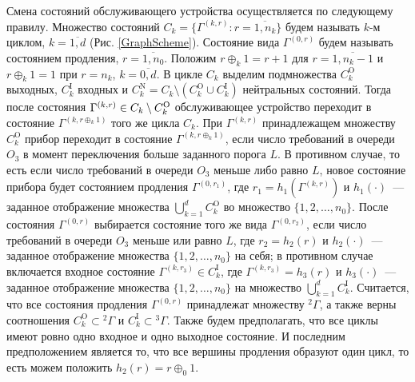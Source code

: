 \documentclass{report}
\begin{document}
Смена состояний обслуживающего устройства осуществляется по следующему правилу. Множество состояний $C_k = \{\Gamma^{(k,r)} \colon r=\overline{1,n_k}\}$ будем называть $k$-м циклом, $k=\overline{1,d}$ (Рис. \ref{GraphScheme}). Состояние вида $\Gamma^{(0,r)}$ будем называть состоянием продления, $r=\overline{1,n_0}$. Положим $r \oplus_k 1 = r+1$ для $r=\overline{1,n_k-1}$ и $r \oplus_k 1 = 1$ при $r=n_k$, $k = \overline{0,d}$. В цикле $C_k$ выделим подмножества $C_k^{\mathrm{O}}$ выходных, $C_k^{\mathrm{I}}$ входных и $C_k^{\mathrm{N}} = C_k \setminus (C_k^{\mathrm{O}} \cup C_k^{\mathrm{I}})$ нейтральных состояний. Тогда после состояния $\Gamma^{(k,r)} \hm\in C_k\setminus C_k^{\mathrm{O}}$ обслуживающее устройство переходит в состояние $\Gamma^{(k,r \oplus_k 1)}$ того же цикла $C_k$. При $\Gamma^{(k,r)}$ принадлежащем множеству $C_k^{\mathrm{O}}$ прибор переходит в состояние $\Gamma^{(k,r \oplus_k 1)}$, если число требований в очереди $O_3$ в момент переключения больше заданного порога $L$. В противном случае, то есть если число требований в очереди $O_3$ меньше либо равно $L$, новое состояние прибора будет состоянием продления $\Gamma^{(0,r_1)}$, где $r_1=h_1(\Gamma^{(k,r)})$ и $h_1(\cdot)$~--- заданное отображение множества $\bigcup\limits_{k=1}^d C_k^{\mathrm{O}}$ во множество $\{1,2,\ldots, n_0\}$. После состояния $\Gamma^{(0,r)}$ выбирается состояние того же вида $\Gamma^{(0,r_2)}$, если число требований в очереди $O_3$ меньше или равно $L$, где $r_2=h_2(r)$ и $h_2(\cdot)$~--- заданное отображение множества $\{1,2, \ldots, n_0\}$ на себя; в противном случае включается входное состояние $\Gamma^{(k,r_3)} \in C_k^{\mathrm{I}}$, где $\Gamma^{(k,r_3)}=h_3(r)$ и $h_3(\cdot)$~--- заданное отображение множества $\{1,2, \ldots, n_0\}$ на множество  $\bigcup\limits_{k=1}^d C_k^{\mathrm{I}}$. Считается, что все состояния продления $\Gamma^{(0,r)}$ принадлежат множеству ${}^2 \Gamma$, а также верны соотношения $C_k^\mathrm{O}\subset {}^2 \Gamma$ и $C_k^\mathrm{I}\subset {}^3 \Gamma$. Также будем предполагать, что все циклы имеют ровно одно входное и одно выходное состояние. И последним предположением является то, что все вершины продления образуют один цикл, то есть можем положить $h_2(r)=r\oplus_0 1$.
\end{document}
